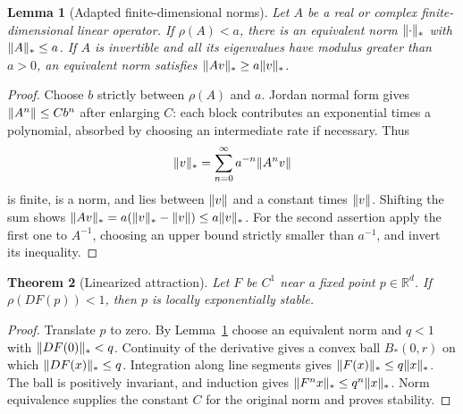 \documentclass[11pt,oneside]{book}
\newtheorem{theorem}{Theorem}[chapter]
\newtheorem{lemma}[theorem]{Lemma}
\theoremstyle{definition}
\theoremstyle{remark}\newtheorem{remark}[theorem]{Remark}
\newcommand{\R}{\mathbb R}\newcommand{\C}{\mathbb C}
\begin{document}
\begin{lemma}[Adapted finite-dimensional norms]\label{d13:15:adapted-norm}
Let \(A\) be a real or complex finite-dimensional linear operator. If
\(\rho(A)<a\), there is an equivalent norm \(\lVert\cdot\rVert_*\) with
\(\lVert A\rVert_*\leq a\). If \(A\) is invertible and all its eigenvalues have
modulus greater than \(a>0\), an equivalent norm satisfies
\(\lVert Av\rVert_*\geq a\lVert v\rVert_*\).
\end{lemma}
\begin{proof}
Choose \(b\) strictly between \(\rho(A)\) and \(a\). Jordan normal form
gives \(\lVert A^n\rVert\leq Cb^n\) after enlarging \(C\): each block contributes
an exponential times a polynomial, absorbed by choosing an intermediate
rate if necessary. Thus
\[
 \lVert v\rVert_*=\sum_{n=0}^\infty a^{-n}\lVert A^nv\rVert
\]
is finite, is a norm, and lies between \(\lVert v\rVert\) and a constant times
\(\lVert v\rVert\). Shifting the sum shows
\(\lVert Av\rVert_*=a(\lVert v\rVert_*-\lVert v\rVert)\leq a\lVert v\rVert_*\).
For the second assertion apply the first one to \(A^{-1}\), choosing
an upper bound strictly smaller than \(a^{-1}\), and invert its inequality.
\end{proof}

\begin{theorem}[Linearized attraction]\label{d13:15:linearized-stability}
Let \(F\) be \(C^1\) near a fixed point \(p\in\R^d\). If
\(\rho(DF(p))<1\), then \(p\) is locally exponentially stable.
\end{theorem}
\begin{proof}
Translate \(p\) to zero. By Lemma~\ref{d13:15:adapted-norm} choose an
equivalent norm and \(q<1\) with \(\lVert DF(0)\rVert_*<q\). Continuity of the
derivative gives a convex ball \(B_*(0,r)\) on which
\(\lVert DF(x)\rVert_*\leq q\). Integration along line segments gives
\(\lVert F(x)\rVert_*\leq q\lVert x\rVert_*\). The ball is positively invariant, and
induction gives \(\lVert F^nx\rVert_*\leq q^n\lVert x\rVert_*\). Norm equivalence
supplies the constant \(C\) for the original norm and proves stability.
\end{proof}
\end{document}
